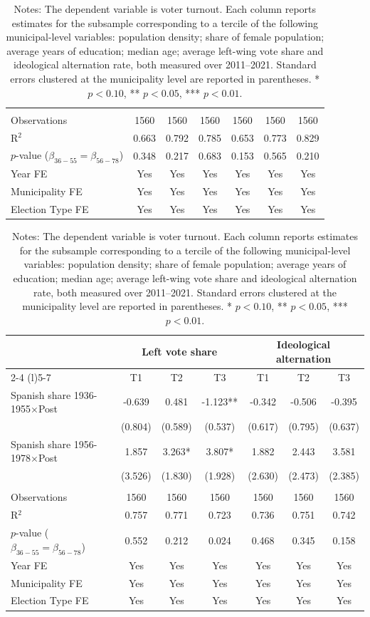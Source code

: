 \begin{table}[!h]
\begin{tabular*}{\textwidth}{l@{\extracolsep{\fill}}cccccc}
 & & & & & & \\
Observations & 1560 & 1560 & 1560 & 1560 & 1560 & 1560\\
R$^2$ & 0.663 & 0.792 & 0.785 & 0.653 & 0.773 & 0.829\\
$p$-value ($\beta_{36{-}55} = \beta_{56{-}78}$) & 0.348 & 0.217 & 0.683 & 0.153 & 0.565 & 0.210\\
Year FE & Yes & Yes & Yes & Yes & Yes & Yes\\
Municipality FE & Yes & Yes & Yes & Yes & Yes & Yes\\
Election Type FE & Yes & Yes & Yes & Yes & Yes & Yes\\
\hline
\end{tabular*}
\begin{tabular*}{\textwidth}{l@{\extracolsep{\fill}}cccccc}
 & \multicolumn{3}{c}{Left vote share} & \multicolumn{3}{c}{Ideological alternation} \\
\cmidrule(l){2-4} \cmidrule(l){5-7}
  & T1 & T2 & T3 & T1  & T2  & T3 \\
\hline
Spanish share 1936-1955$\times$Post & -0.639 & 0.481 & -1.123** & -0.342 & -0.506 & -0.395\\
 & (0.804) & (0.589) & (0.537) & (0.617) & (0.795) & (0.637)\\
Spanish share 1956-1978$\times$Post & 1.857 & 3.263* & 3.807* & 1.882 & 2.443 & 3.581\\
 & (3.526) & (1.830) & (1.928) & (2.630) & (2.473) & (2.385)\\

 & & & & & & \\
Observations & 1560 & 1560 & 1560 & 1560 & 1560 & 1560\\
R$^2$ & 0.757 & 0.771 & 0.723 & 0.736 & 0.751 & 0.742\\
$p$-value ($\beta_{36{-}55} = \beta_{56{-}78}$) & 0.552 & 0.212 & 0.024 & 0.468 & 0.345 & 0.158\\
Year FE & Yes & Yes & Yes & Yes & Yes & Yes\\
Municipality FE & Yes & Yes & Yes & Yes & Yes & Yes\\
Election Type FE & Yes & Yes & Yes & Yes & Yes & Yes\\
\hline
\end{tabular*}
\addvspace{0.3em}
\captionsetup{font=footnotesize, justification=justified, singlelinecheck=false}
\caption*{Notes: The dependent variable is voter turnout. Each column reports estimates for the subsample corresponding to a tercile of the following municipal-level variables: population density; share of female population; average years of education; median age; average left-wing vote share and ideological alternation rate, both measured over 2011–2021. Standard errors clustered at the municipality level are reported in parentheses. * $p<0.10$, ** $p<0.05$, *** $p<0.01$.}
\end{table}
